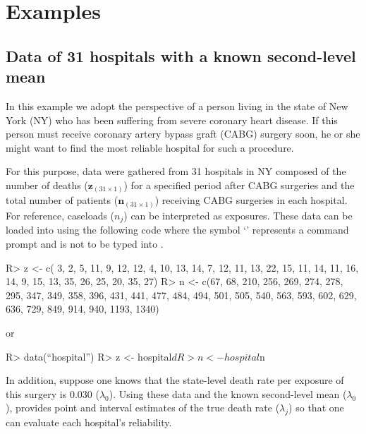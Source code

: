 \documentclass[article]{jss}
\begin{document}
\section[Examples]{Examples}
\subsection[Known Second-level Mean]{Data of 31 hospitals with a known second-level mean}
\label{sec:ex:hosp}
In this example we adopt the perspective of a person living in the state of New York (NY) who has been suffering from severe coronary heart disease. If this person must receive coronary artery bypass graft (CABG) surgery soon, he or she might want to find the most reliable hospital for such a procedure.


For this purpose, data were gathered from 31 hospitals in NY composed of the number of deaths ($\textbf{z}_{(31\times1)}$) for a specified period after CABG surgeries and the total number of patients ($\textbf{n}_{(31\times1)}$) receiving CABG surgeries in each hospital. For reference, caseloads ($n_{j}$) can be interpreted as exposures. These data can be loaded into  using the following code where the symbol `' represents a command prompt and is not to be typed into .

\begin{CodeChunk}
\begin{CodeInput}
R> z <- c( 3,   2,   5,  11,   9,  12,  12,   4,  10,  13,  14,   7,  12,
          11,  13,  22,  15,  11,  14,  11,  16,  14,   9,  15,  13,  35,
          26,  25,  20,  35,  27)
R> n <- c(67,  68, 210, 256, 269, 274, 278, 295, 347, 349, 358, 396, 431,
         441, 477, 484, 494, 501, 505, 540, 563, 593, 602, 629, 636, 729,
         849, 914, 940, 1193, 1340)
\end{CodeInput}
\end{CodeChunk}
or
\begin{CodeChunk}
\begin{CodeInput}
R> data(``hospital'')
R> z <- hospital$d
R> n <- hospital$n
\end{CodeInput}
\end{CodeChunk}


In addition, suppose one knows that the state-level death rate per exposure of this surgery is 0.030 ($\lambda_{0}$). Using these data and the known second-level mean ($\lambda_{0}$),  provides point and interval estimates of the true death rate ($\lambda_{j}$) so that one can evaluate each hospital's reliability. 
\end{document}
